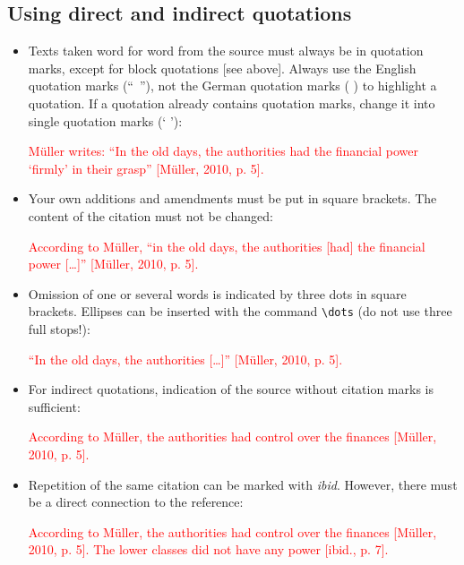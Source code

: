 \subsection{Using direct and indirect quotations}
\begin{itemize}
	\item Texts taken word for word from the source must always be in quotation marks, except for block quotations [see above]. Always use the English quotation marks \mbox{(`` '')}, not the German quotation marks (\glqq{} \grqq) to highlight a quotation. If a quotation already contains quotation marks, change it into single quotation marks (` '):
	\begin{addmargin}[10pt]{0pt}
		\textcolor{red}{Müller writes: ``In the old days, the authorities had the financial power `firmly' in their grasp'' [Müller, 2010, p. 5].}
	\end{addmargin}
	\item Your own additions and amendments must be put in square brackets. The content of the citation must not be changed:
	\begin{addmargin}[10pt]{0pt}
		\textcolor{red}{According to Müller, ``in the old days, the authorities [had] the financial power [\dots]'' [Müller, 2010, p. 5].}
	\end{addmargin}
	\item Omission of one or several words is indicated by three dots in square brackets. Ellipses can be inserted with the command \verb|\dots| (do not use three full stops!):
	\begin{addmargin}[10pt]{0pt}
		\textcolor{red}{``In the old days, the authorities [\dots]'' [Müller, 2010, p. 5].}
	\end{addmargin}
	\item For indirect quotations, indication of the source without citation marks is sufficient:
	\begin{addmargin}[10pt]{0pt}
		\textcolor{red}{According to Müller, the authorities had control over the finances [\cf Müller, 2010, p. 5].}
	\end{addmargin}
	\item Repetition of the same citation can be marked with \textit{ibid}. However, there must be a direct connection to the reference:
	\begin{addmargin}[10pt]{0pt}
		\textcolor{red}{According to Müller, the authorities had control over the finances [\cf Müller, 2010, p. 5]. The lower classes did not have any power [\cf ibid., p. 7].}
	\end{addmargin}
\end{itemize}

